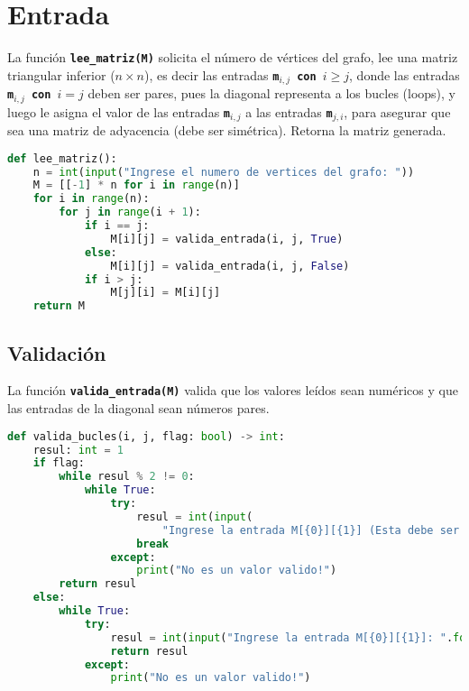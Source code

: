 \section{Entrada}
La función \texttt{\textbf{lee\_matriz(M)}} solicita el número de vértices del grafo, lee una matriz triangular inferior ($n\times n$), es decir las entradas \texttt{\textbf{m$_{i,j}$ con $i\ge j$}}, donde las  entradas \texttt{\textbf{m$_{i,j}$ con $i=j$}} deben ser pares, pues la diagonal representa a los bucles (loops), y luego le asigna el valor de las entradas \texttt{\textbf{m$_{i,j}$}} a las entradas \texttt{\textbf{m$_{j,i}$}}, para asegurar que sea una matriz de adyacencia (debe ser simétrica). Retorna la matriz generada.
\begin{lstlisting}[language=python, caption=Función lee\_matriz()]
def lee_matriz():
    n = int(input("Ingrese el numero de vertices del grafo: "))
    M = [[-1] * n for i in range(n)]
    for i in range(n):
        for j in range(i + 1):
            if i == j:
                M[i][j] = valida_entrada(i, j, True)
            else:
                M[i][j] = valida_entrada(i, j, False)
            if i > j:
                M[j][i] = M[i][j]
    return M
\end{lstlisting}
\subsection{Validación}
La función \texttt{\textbf{valida\_entrada(M)}} valida que los valores leídos sean numéricos y que las entradas de la diagonal sean números pares.
\begin{lstlisting}[language=python, caption=Función valida\_entrada()]
def valida_bucles(i, j, flag: bool) -> int:
    resul: int = 1
    if flag:
        while resul % 2 != 0:
            while True:
                try:
                    resul = int(input(
                        "Ingrese la entrada M[{0}][{1}] (Esta debe ser par): ".format(str(i + 1), str(j + 1))))
                    break
                except:
                    print("No es un valor valido!")
        return resul
    else:
        while True:
            try:
                resul = int(input("Ingrese la entrada M[{0}][{1}]: ".format(str(i + 1), str(j + 1))))
                return resul
            except:
                print("No es un valor valido!")
\end{lstlisting}